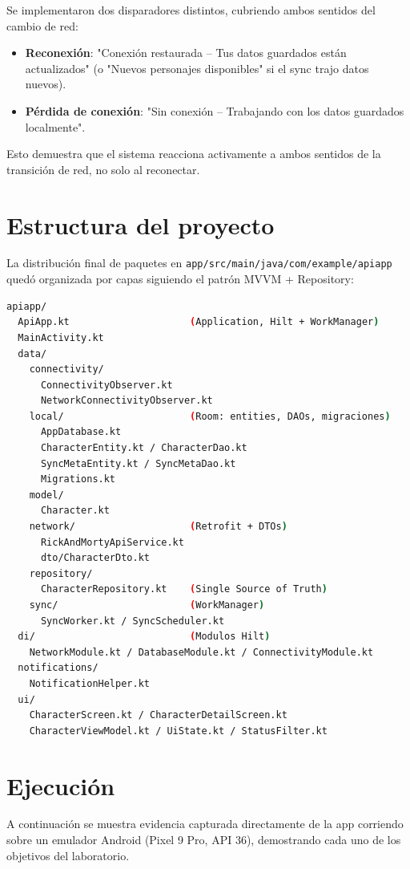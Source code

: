 \documentclass{article}
\begin{document}
	Se implementaron dos disparadores distintos, cubriendo ambos sentidos del cambio de red:
	\begin{itemize}
		\item \textbf{Reconexión}: "Conexión restaurada -- Tus datos guardados están actualizados" (o "Nuevos personajes disponibles" si el sync trajo datos nuevos).
		\item \textbf{Pérdida de conexión}: "Sin conexión -- Trabajando con los datos guardados localmente".
	\end{itemize}
	Esto demuestra que el sistema reacciona activamente a ambos sentidos de la transición de red, no solo al reconectar.

	\section{Estructura del proyecto}
	La distribución final de paquetes en \texttt{app/src/main/java/com/example/apiapp} quedó organizada por capas siguiendo el patrón MVVM + Repository:
	\begin{lstlisting}[language=bash,caption={Estructura de paquetes de la aplicacion}]
apiapp/
  ApiApp.kt                     (Application, Hilt + WorkManager)
  MainActivity.kt
  data/
    connectivity/
      ConnectivityObserver.kt
      NetworkConnectivityObserver.kt
    local/                      (Room: entities, DAOs, migraciones)
      AppDatabase.kt
      CharacterEntity.kt / CharacterDao.kt
      SyncMetaEntity.kt / SyncMetaDao.kt
      Migrations.kt
    model/
      Character.kt
    network/                    (Retrofit + DTOs)
      RickAndMortyApiService.kt
      dto/CharacterDto.kt
    repository/
      CharacterRepository.kt    (Single Source of Truth)
    sync/                       (WorkManager)
      SyncWorker.kt / SyncScheduler.kt
  di/                           (Modulos Hilt)
    NetworkModule.kt / DatabaseModule.kt / ConnectivityModule.kt
  notifications/
    NotificationHelper.kt
  ui/
    CharacterScreen.kt / CharacterDetailScreen.kt
    CharacterViewModel.kt / UiState.kt / StatusFilter.kt
	\end{lstlisting}

	\section{Ejecución}
	A continuación se muestra evidencia capturada directamente de la app corriendo sobre un emulador Android (Pixel 9 Pro, API 36), demostrando cada uno de los objetivos del laboratorio.
\end{document}
